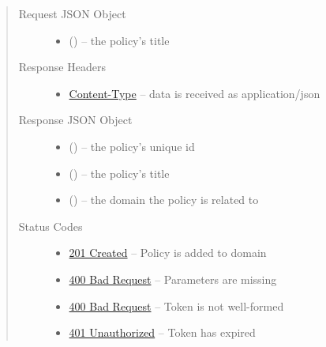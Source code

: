 \documentclass[letterpaper,10pt,english]{sphinxmanual}
\begin{document}
\begin{fulllineitems}
\begin{quote}
\begin{description}
\item[{Request JSON Object}] \leavevmode\begin{itemize}
\item {} 
 () -- the policy's title

\end{itemize}

\item[{Response Headers}] \leavevmode\begin{itemize}
\item {} 
\href{http://tools.ietf.org/html/rfc7231\#section-3.1.1.5}{Content-Type} -- data is received as application/json

\end{itemize}

\item[{Response JSON Object}] \leavevmode\begin{itemize}
\item {} 
 () -- the policy's unique id

\item {} 
 () -- the policy's title

\item {} 
 () -- the domain the policy is related to

\end{itemize}

\item[{Status Codes}] \leavevmode\begin{itemize}
\item {} 
\href{http://www.w3.org/Protocols/rfc2616/rfc2616-sec10.html\#sec10.2.2}{201 Created} -- Policy is added to domain

\item {} 
\href{http://www.w3.org/Protocols/rfc2616/rfc2616-sec10.html\#sec10.4.1}{400 Bad Request} -- Parameters are missing

\item {} 
\href{http://www.w3.org/Protocols/rfc2616/rfc2616-sec10.html\#sec10.4.1}{400 Bad Request} -- Token is not well-formed

\item {} 
\href{http://www.w3.org/Protocols/rfc2616/rfc2616-sec10.html\#sec10.4.2}{401 Unauthorized} -- Token has expired


\end{itemize}
\end{description}
\end{quote}
\end{fulllineitems}
\end{document}
